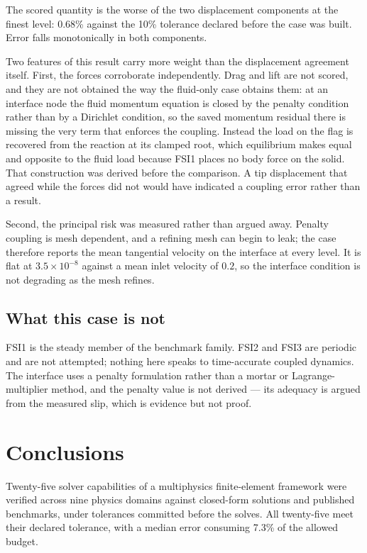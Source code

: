 \documentclass[11pt,a4paper]{article}
\begin{document}
The scored quantity is the worse of the two displacement components at the finest
level: 0.68\% against the 10\% tolerance declared before the case was built.
Error falls monotonically in both components.

Two features of this result carry more weight than the displacement agreement
itself. First, the forces corroborate independently. Drag and lift are not
scored, and they are not obtained the way the fluid-only case obtains them: at an
interface node the fluid momentum equation is closed by the penalty condition
rather than by a Dirichlet condition, so the saved momentum residual there is
missing the very term that enforces the coupling. Instead the load on the flag is
recovered from the reaction at its clamped root, which equilibrium makes equal
and opposite to the fluid load because FSI1 places no body force on the solid.
That construction was derived before the comparison. A tip displacement that
agreed while the forces did not would have indicated a coupling error rather than
a result.

Second, the principal risk was measured rather than argued away. Penalty coupling
is mesh dependent, and a refining mesh can begin to leak; the case therefore
reports the mean tangential velocity on the interface at every level. It is flat
at $3.5\times10^{-8}$ against a mean inlet velocity of $0.2$, so the interface
condition is not degrading as the mesh refines.

\subsection{What this case is not}
FSI1 is the steady member of the benchmark family. FSI2 and FSI3 are periodic and
are not attempted; nothing here speaks to time-accurate coupled dynamics. The
interface uses a penalty formulation rather than a mortar or Lagrange-multiplier
method, and the penalty value is not derived --- its adequacy is argued from the
measured slip, which is evidence but not proof.

\section{Conclusions}

Twenty-five solver capabilities of a multiphysics finite-element framework were
verified across nine physics domains against closed-form solutions and published
benchmarks, under tolerances committed before the solves. All twenty-five meet
their declared tolerance, with a median error consuming 7.3\% of the allowed
budget.
\end{document}
